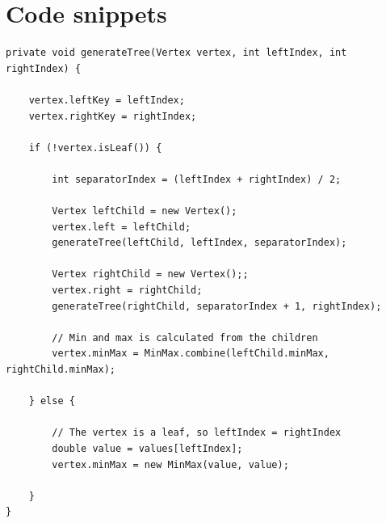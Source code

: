 
\appendix

\section{Code snippets} \label{app:code-snippets}

\begin{lstlisting}
private void generateTree(Vertex vertex, int leftIndex, int rightIndex) {

    vertex.leftKey = leftIndex;
    vertex.rightKey = rightIndex;

    if (!vertex.isLeaf()) {

        int separatorIndex = (leftIndex + rightIndex) / 2;

        Vertex leftChild = new Vertex();
        vertex.left = leftChild;
        generateTree(leftChild, leftIndex, separatorIndex);

        Vertex rightChild = new Vertex();;
        vertex.right = rightChild;
        generateTree(rightChild, separatorIndex + 1, rightIndex);

        // Min and max is calculated from the children
        vertex.minMax = MinMax.combine(leftChild.minMax, rightChild.minMax);

    } else {

        // The vertex is a leaf, so leftIndex = rightIndex
        double value = values[leftIndex];
        vertex.minMax = new MinMax(value, value);

    }
}
\end{lstlisting}

